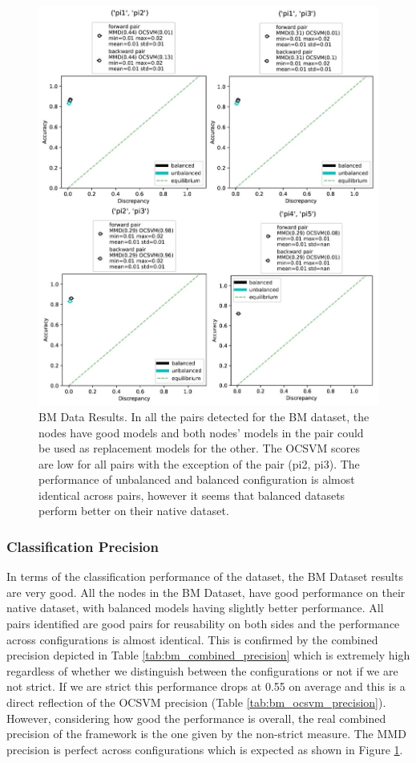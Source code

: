 \documentclass{mpaper}
\begin{document}
\begin{figure}[ht!]
    \centering
    \includegraphics[scale= 0.5]{bm_results.JPG}
    \caption{BM Data Results. In all the pairs detected for the BM dataset, the nodes have good models and both nodes' models in the pair could be used as replacement models for the other. The OCSVM scores are low for all pairs with the exception of the pair (pi2, pi3). The performance of unbalanced and balanced configuration is almost identical across pairs, however it seems that balanced datasets perform better on their native dataset.}
    \label{fig:bm_results}
\end{figure}

\subsubsection{Classification Precision}

In terms of the classification performance of the dataset, the BM Dataset results are very good. All the nodes in the BM Dataset, have good performance on their native dataset, with balanced models having slightly better performance. All pairs identified are good pairs for reusability on both sides and the performance across configurations is almost identical. This is confirmed by the combined precision depicted in Table  \ref{tab:bm_combined_precision} which is extremely high regardless of whether we distinguish between the configurations or not if we are not strict. If we are strict this performance drops at 0.55 on average and this is a direct reflection of the OCSVM precision (Table \ref{tab:bm_ocsvm_precision}). However, considering how good the performance is overall, the real combined precision of the framework is the one given by the non-strict measure. The MMD precision is perfect across configurations which is expected as shown in Figure \ref{fig:bm_results}. 
\end{document}

